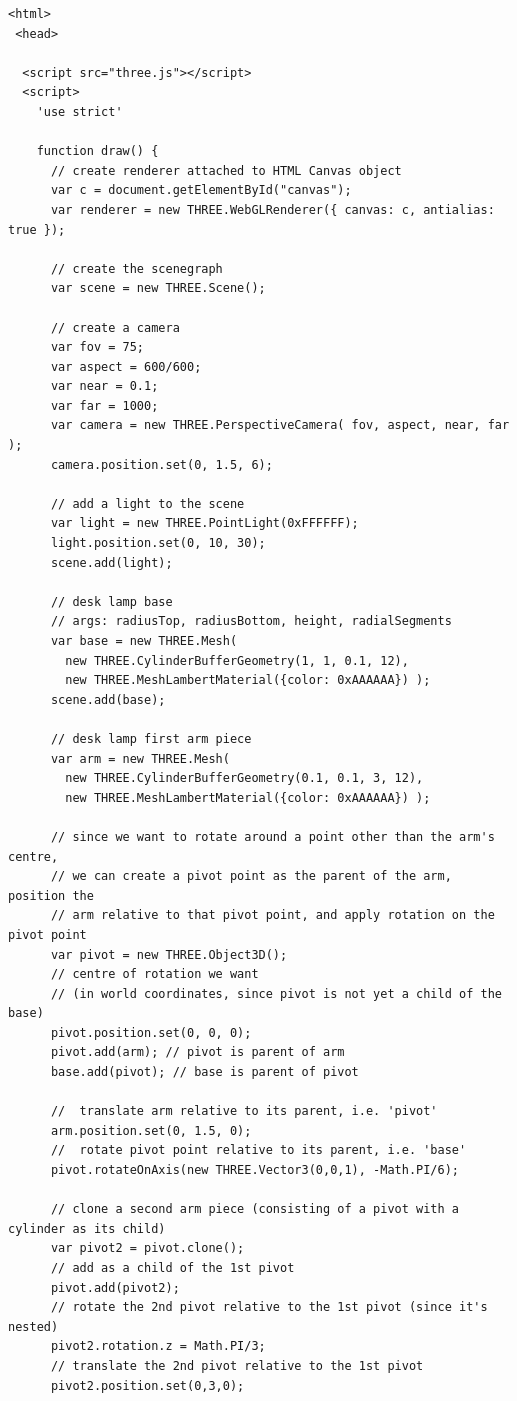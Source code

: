 \documentclass[a4paper,11pt]{article}
\newenvironment{code}{\captionsetup{type=listing}}{}
\begin{document}
\begin{code}
\begin{verbatim}
<html>
 <head>
  
  <script src="three.js"></script>
  <script>
    'use strict'

    function draw() {
      // create renderer attached to HTML Canvas object
      var c = document.getElementById("canvas");
      var renderer = new THREE.WebGLRenderer({ canvas: c, antialias: true });

      // create the scenegraph 
      var scene = new THREE.Scene();

      // create a camera
      var fov = 75;
      var aspect = 600/600;
      var near = 0.1;
      var far = 1000;
      var camera = new THREE.PerspectiveCamera( fov, aspect, near, far );
      camera.position.set(0, 1.5, 6);

      // add a light to the scene
      var light = new THREE.PointLight(0xFFFFFF);
      light.position.set(0, 10, 30);
      scene.add(light);

      // desk lamp base
      // args: radiusTop, radiusBottom, height, radialSegments
      var base = new THREE.Mesh(
        new THREE.CylinderBufferGeometry(1, 1, 0.1, 12), 
        new THREE.MeshLambertMaterial({color: 0xAAAAAA}) );
      scene.add(base);

      // desk lamp first arm piece
      var arm = new THREE.Mesh(
        new THREE.CylinderBufferGeometry(0.1, 0.1, 3, 12), 
        new THREE.MeshLambertMaterial({color: 0xAAAAAA}) );

      // since we want to rotate around a point other than the arm's centre,
      // we can create a pivot point as the parent of the arm, position the
      // arm relative to that pivot point, and apply rotation on the pivot point
      var pivot = new THREE.Object3D();
      // centre of rotation we want 
      // (in world coordinates, since pivot is not yet a child of the base)
      pivot.position.set(0, 0, 0); 
      pivot.add(arm); // pivot is parent of arm
      base.add(pivot); // base is parent of pivot

      //  translate arm relative to its parent, i.e. 'pivot'
      arm.position.set(0, 1.5, 0);
      //  rotate pivot point relative to its parent, i.e. 'base'
      pivot.rotateOnAxis(new THREE.Vector3(0,0,1), -Math.PI/6);

      // clone a second arm piece (consisting of a pivot with a cylinder as its child)
      var pivot2 = pivot.clone();
      // add as a child of the 1st pivot
      pivot.add(pivot2);
      // rotate the 2nd pivot relative to the 1st pivot (since it's nested)
      pivot2.rotation.z = Math.PI/3;
      // translate the 2nd pivot relative to the 1st pivot
      pivot2.position.set(0,3,0);


\end{verbatim}
\end{code}
\end{document}
